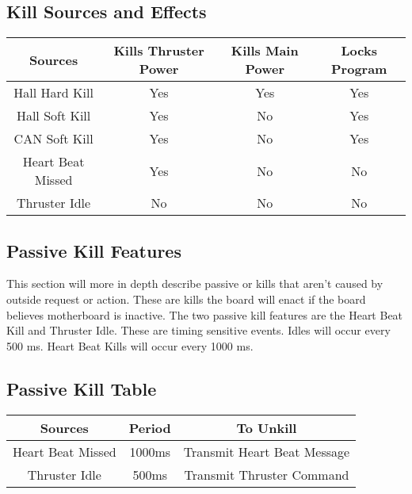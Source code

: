 \documentclass[a4paper,12pt,oneside,pdflatex,italian,final,twocolumn]{article}
\begin{document}
\subsection{Kill Sources and Effects}
\centering
\begin{tabular}{c|c|c|c}
\toprule
Sources             & Kills Thruster Power & Kills Main Power  & Locks Program  \\
\midrule
Hall Hard Kill      & Yes                 & Yes               &  Yes\\
Hall Soft Kill      & Yes                 & No                &  Yes\\
CAN  Soft Kill      & Yes                 & No                &  Yes\\
Heart Beat Missed   & Yes                 & No                &  No \\
Thruster Idle       & No                  & No                &  No \\
\bottomrule
\end{tabular}

\vspace{-5cm}
\raggedright
\subsection{Passive Kill Features}
\vspace{-1cm}
This section will more in depth describe passive or kills that aren't caused by outside request or action. These are kills the board will enact if the board believes motherboard is inactive. The two passive kill features are the Heart Beat Kill and Thruster Idle. These are timing sensitive events. 
Idles will occur every 500 ms. Heart Beat Kills will occur every 1000 ms. 

\vspace{-4cm}
\subsection{Passive Kill Table}
\vspace{-1cm}
\centering
\begin{tabular}{c|c|c}
\toprule
Sources             & Period              & To Unkill  \\
\midrule
Heart Beat Missed   & 1000ms                 & Transmit Heart Beat Message               \\ 
Thruster Idle       & 500ms                  & Transmit Thruster Command               \\
\bottomrule
\end{tabular}
\end{document}
